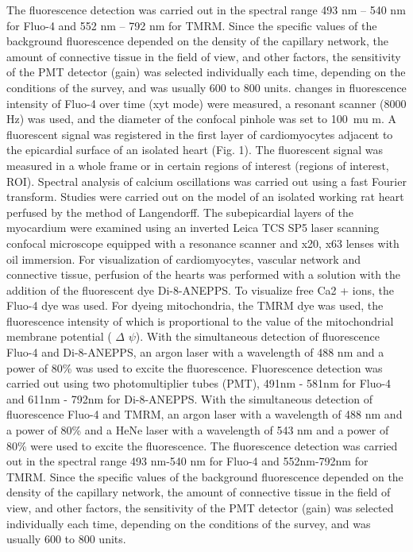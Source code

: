 \documentclass[a4paper,12pt]{article}
\begin{document}
The fluorescence detection was carried out in the spectral range 493 nm -- 540 nm for Fluo-4 and 552 nm -- 792 nm for TMRM. Since the specific values of the background fluorescence depended on the density of the capillary network, the amount of connective tissue in the field of view, and other factors, the sensitivity of the PMT detector (gain) was selected individually each time, depending on the conditions of the survey, and was usually 600 to 800 units.
changes in fluorescence intensity of Fluo-4 over time (xyt mode) were measured, a resonant scanner (8000 Hz) was used, and the diameter of the confocal pinhole was set to 100\ mu m.
A fluorescent signal was registered in the first layer of cardiomyocytes adjacent to the epicardial surface of an isolated heart (Fig. 1). The fluorescent signal was measured in a whole frame or in certain regions of interest (regions of interest, ROI).
Spectral analysis of calcium oscillations was carried out using a fast Fourier transform.
Studies were carried out on the model of an isolated working rat heart perfused by the method of Langendorff.
The subepicardial layers of the myocardium were examined using an inverted Leica TCS SP5 laser scanning confocal microscope equipped with a resonance scanner and x20, x63 lenses with oil immersion.
For visualization of cardiomyocytes, vascular network and connective tissue, perfusion of the hearts was performed with a solution with the addition of the fluorescent dye Di-8-ANEPPS.
To visualize free Ca2 + ions, the Fluo-4 dye was used.
For dyeing mitochondria, the TMRM dye was used, the fluorescence intensity of which is proportional to the value of the mitochondrial membrane potential ( $\Delta$ $\psi$).
With the simultaneous detection of fluorescence Fluo-4 and Di-8-ANEPPS, an argon laser with a wavelength of 488 nm and a power of 80\% was used to excite the fluorescence.
Fluorescence detection was carried out using two photomultiplier tubes (PMT), 491nm - 581nm for Fluo-4 and 611nm - 792nm for Di-8-ANEPPS.
With the simultaneous detection of fluorescence Fluo-4 and TMRM, an argon laser with a wavelength of 488 nm and a power of 80\% and a HeNe laser with a wavelength of 543 nm and a power of 80\% were used to excite the fluorescence.
The fluorescence detection was carried out in the spectral range 493 nm-540 nm for Fluo-4 and 552nm-792nm for TMRM.
Since the specific values of the background fluorescence depended on the density of the capillary network, the amount of connective tissue in the field of view, and other factors, the sensitivity of the PMT detector (gain) was selected individually each time, depending on the conditions of the survey, and was usually 600 to 800 units.
\end{document}
